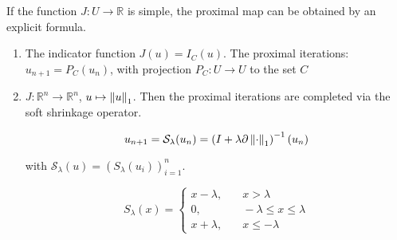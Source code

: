 \begin{example}
	If the function $J:U\rightarrow \mathbb{R}$ is simple, the proximal map can be obtained by an explicit formula. 
	\begin{enumerate}
		\item The indicator function $J(u)=I_C(u)$. The proximal iterations: $u_{n+1}=P_C(u_n)$, with projection $P_C:U\rightarrow U$ to the set $C$
		\item $J:\mathbb{R}^n \rightarrow \mathbb{R}^n$, $u\mapsto \left\lVert u\right\rVert_1$. Then the proximal iterations are completed via the soft shrinkage operator.
		
		\begin{equation*}
			u_{n+1} = \mathcal{S}_\lambda (u_n) = \left(I+\lambda \partial \left\lVert\cdot\right\rVert_1\right)^{-1} (u_n)
		\end{equation*}
		
		with $\mathcal{S}_\lambda (u) = (S_\lambda(u_i))^n_{i=1} $.
		
		\begin{equation*}
			S_\lambda(x)=\left\lbrace\begin{array}{ll}
			x-\lambda, &\quad x>\lambda \\
			0, &\quad  -\lambda \leq x \leq \lambda \\
			x+\lambda, &\quad x \leq -\lambda
			\end{array}\right.
		\end{equation*}
	\end{enumerate}
\end{example}
